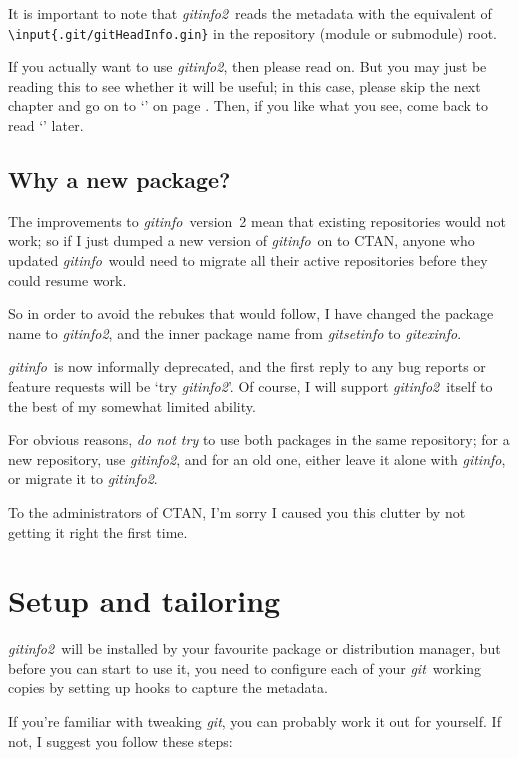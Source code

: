 \documentclass[a4paper,12pt,twoside,openany]{memoir}
\newcommand{\sfit}[1]{\textit{#1}}
\newcommand{\git}{\sfit{git}}
\newcommand{\opname}{\sfit{gitinfo}}
\newcommand{\tpname}{\sfit{gitinfo2}}
\newcommand{\ginname}{gitHeadInfo.gin}
\begin{document}
It is important to note that \tpname\ reads the metadata
with the equivalent of \texttt{\textbackslash input\{.git/\ginname\}}
in the repository (module or submodule) root.

If you actually want to use \tpname, then please read on.
But you may just be reading this to see whether it will be useful;
in this case,
please skip the next chapter and go on to `'
on page \pageref*{ch:using}.
Then, if you like what you see, come back to
read `' later.

\clearpage
\section{Why a new package?}

The improvements to \opname\ version~2 mean that
existing repositories would not work;
so if I just dumped a new version of \opname\
on to CTAN, anyone who updated \opname\
would need to migrate all their active repositories
before they could resume work.

So in order to avoid the rebukes that would follow,
I have changed the package name to \tpname,
and the inner package name from \sfit{gitsetinfo}
to \sfit{gitexinfo}.

\opname\ is now informally deprecated,
and the first reply to any bug reports or feature requests
will be `try \tpname'.
Of course, I will support \tpname\ itself
to the best of my somewhat limited ability.

For obvious reasons, \emph{do not try}
to use both packages in the same repository;
for a new repository, use \tpname,
and for an old one, either leave it alone with \opname,
or migrate it to \tpname.

To the administrators of CTAN,
I'm sorry I caused you this clutter
by not getting it right the first time.

\chapter{Setup and tailoring}
\label{ch:setup}

\tpname\ will be installed by your favourite package or distribution manager,
but before you can start to use it,
you need to configure each of your \git\ working copies
by setting up hooks to capture the metadata.

If you're familiar with tweaking \git, you can probably work it out for yourself.
If not, I suggest you follow these steps:
\end{document}
